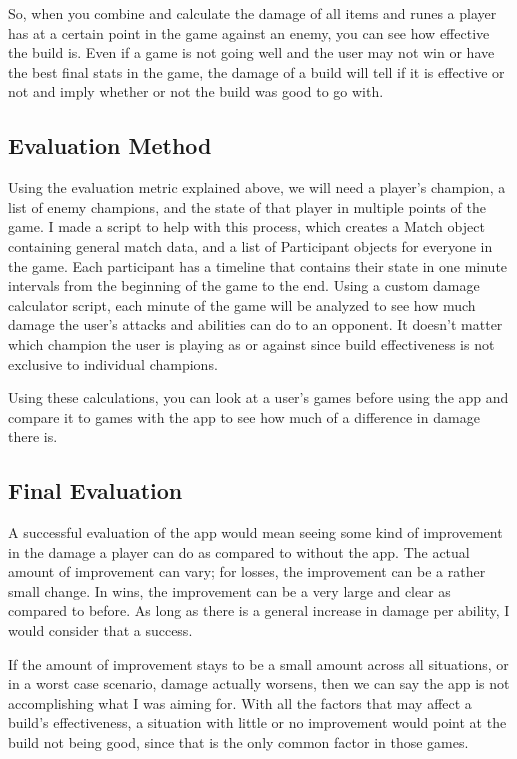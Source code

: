 \documentclass[10pt,twocolumn]{article}
\begin{document}
So, when you combine and calculate the damage of all items and runes a player has at a certain point in the game against an enemy, you can see how effective the build is.
Even if a game is not going well and the user may not win or have the best final stats in the game, the damage of a build will tell if it is effective or not and imply whether or not the build was good to go with.

\subsection{Evaluation Method}
Using the evaluation metric explained above, we will need a player's champion, a list of enemy champions, and the state of that player in multiple points of the game.
I made a script to help with this process, which creates a Match object containing general match data, and a list of Participant objects for everyone in the game.
Each participant has a timeline that contains their state in one minute intervals from the beginning of the game to the end.
Using a custom damage calculator script, each minute of the game will be analyzed to see how much damage the user's attacks and abilities can do to an opponent.
It doesn't matter which champion the user is playing as or against since build effectiveness is not exclusive to individual champions.

Using these calculations, you can look at a user's games before using the app and compare it to games with the app to see how much of a difference in damage there is.

\subsection{Final Evaluation}
A successful evaluation of the app would mean seeing some kind of improvement in the damage a player can do as compared to without the app.
The actual amount of improvement can vary; for losses, the improvement can be a rather small change.
In wins, the improvement can be a very large and clear as compared to before.
As long as there is a general increase in damage per ability, I would consider that a success.

If the amount of improvement stays to be a small amount across all situations, or in a worst case scenario, damage actually worsens, then we can say the app is not accomplishing what I was aiming for.
With all the factors that may affect a build's effectiveness, a situation with little or no improvement would point at the build not being good, since that is the only common factor in those games.
\end{document}
